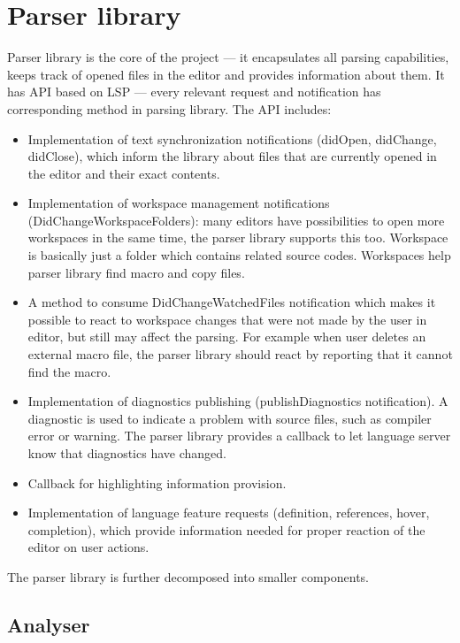 \section{Parser library}

Parser library is the core of the project --- it encapsulates all parsing capabilities, keeps track of opened files in the editor and provides information about them. It has API based on LSP --- every relevant request and notification has corresponding method in parsing library. The API includes:

\begin{itemize}
	\item Implementation of text synchronization notifications (didOpen, didChange, didClose), which inform the library about files that are currently opened in the editor and their exact contents.
	\item Implementation of workspace management notifications (DidChangeWorkspaceFolders): many editors have  possibilities to open more workspaces in the same time, the parser library supports this too. Workspace is basically just a folder which contains related source codes. Workspaces help parser library find macro and copy files.
	\item A method to consume DidChangeWatchedFiles notification which makes it possible to react to workspace changes that were not made by the user in editor, but still may affect the parsing. For example when user deletes an external macro file, the parser library should react by reporting that it cannot find the macro.
	\item Implementation of diagnostics publishing (publishDiagnostics notification). A diagnostic is used to indicate a problem with source files, such as compiler error or warning. The parser library provides a callback to let language server know that diagnostics have changed.
	\item Callback for highlighting information provision.
	\item Implementation of language feature requests (definition, references, hover, completion), which provide information needed for proper reaction of the editor on user actions.
	
\end{itemize}

The parser library is further decomposed into smaller components.

\subsection{Analyser}

